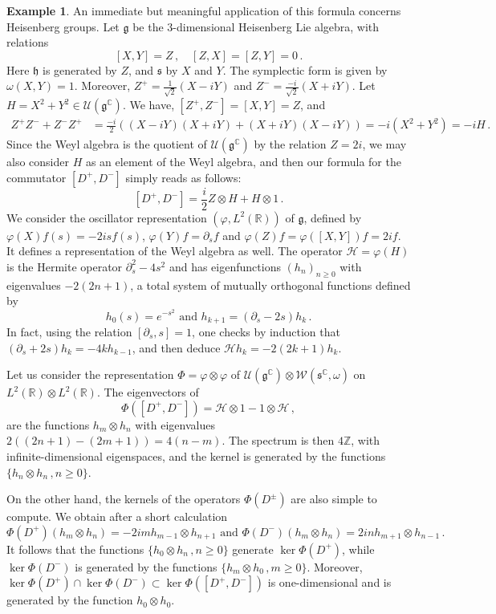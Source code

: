 \documentclass{amsart}[draft,11pt]
\newcommand{\mh}{\mathfrak{h}}
\newcommand{\ms}{\mathfrak{s}}
\newcommand{\fg}{{\mathfrak{g}}}
\numberwithin{equation}{section}
\theoremstyle{definition}
\newtheorem{example}[theorem]{Example}
\begin{document}
\begin{example}
\label{heisenberg}
An immediate but meaningful application of this formula concerns Heisenberg groups. Let $\fg$ be the $3$-dimensional Heisenberg Lie algebra, with relations
$$ [X,Y]=Z \,,\quad [Z,X]=[Z,Y]=0\,.$$
Here $\mh$ is generated by $Z$, and $\ms$ by $X$ and $Y$. The symplectic form is given
by $\omega(X,Y)=1$. Moreover,
$Z^+=\frac{1}{\sqrt{2}}(X- iY)$ and
$Z^-=\frac{-i}{\sqrt{2}}(X+ iY)$. Let 
$H=X^2+Y^2 \in \mathcal{U}(\fg^\mathbb{C})$. We have,
$[Z^+,Z^-]=[X,Y]=Z$, and
\begin{align*}
    Z^+Z^-+Z^-Z^+ 
        &=\frac{-i}{2}((X-iY)(X+iY)+(X+iY)(X-iY)) 
        =-i(X^2+Y^2) = -iH\,.
\end{align*}
Since the Weyl algebra is the quotient of
$\mathcal{U}(\fg^\mathbb{C})$ by the relation $Z=2i$, we may also consider
$H$ as an element of the Weyl algebra, and then our formula for the commutator $[D^+,D^-]$ simply reads as follows:
$$
[D^+,D^-]= \frac{i}{2}Z\otimes H + H\otimes 1\,.
$$
We consider the oscillator representation $(\varphi, L^2(\mathbb{R}))$ of $\fg$, defined by
$\varphi(X)f(s)=-2isf(s)$, $\varphi(Y)f=\partial_s f$ and $\varphi(Z)f=\varphi([X,Y])f=2if$. It defines a representation of the Weyl algebra as well.
The operator $\mathcal{H}=\varphi(H)$ is the Hermite operator
$\partial_s^2-4s^2$ and has eigenfunctions $(h_n)_{n\geq 0}$ with eigenvalues $-2(2n+1)$, a total system of mutually orthogonal functions defined by
$$h_0(s)=e^{-s^2}\text{ and }h_{k+1}=(\partial_s-2s)h_k\,.$$
In fact, using the relation $[\partial_s,s]=1$, one checks by
induction that $(\partial_s+2s)h_k=-4kh_{k-1}$, and then 
deduce $\mathcal{H}h_k=-2(2k+1)h_k$.

Let us consider the representation $\Phi=\varphi\otimes \varphi$ of $\mathcal{U}(\fg^\mathbb{C})\otimes \mathcal{W}(\ms^\mathbb{C},\omega)$ on $L^2(\mathbb{R})\otimes L^2(\mathbb{R})$.
The eigenvectors of
$$\Phi([D^+,D^-])=\mathcal{H}\otimes 1 - 1\otimes \mathcal{H}\,,$$
are the functions $h_m\otimes h_n$ with eigenvalues $2((2n+1)-(2m+1))=4(n-m)$.
The spectrum is then $4\mathbb{Z}$, with infinite-dimensional eigenspaces, and the kernel is generated by the functions $\{h_n\otimes h_n\,, n\geq 0\}$. 

On the other hand, the kernels of the operators $\Phi(D^\pm)$ are also simple to compute. We obtain after a short calculation  
$$
\Phi(D^+)(h_m\otimes h_n)=-2imh_{m-1}\otimes h_{n+1}  \text{ and } \Phi(D^-)(h_m\otimes h_n)=2inh_{m+1}\otimes h_{n-1}\,.
$$ 
It follows that the functions  $\{h_0\otimes h_n\,,n\geq 0\}$ generate
$\ker \Phi(D^+)$, while $\ker \Phi(D^-)$ is generated by the functions $\{h_m\otimes h_0\,,m\geq 0\}$. Moreover, $\ker \Phi(D^+) \cap \ker \Phi(D^-) \subset \ker \Phi([D^+,D^-])$ is one-dimensional and is generated by the function
$h_0\otimes h_0$.


\end{example}
\end{document}
